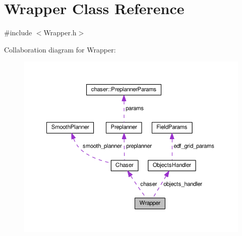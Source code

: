 \hypertarget{class_wrapper}{}\section{Wrapper Class Reference}
\label{class_wrapper}


{\ttfamily \#include $<$Wrapper.\+h$>$}



Collaboration diagram for Wrapper\+:\nopagebreak
\begin{figure}[H]
\begin{center}
\leavevmode
\includegraphics[width=350pt]{class_wrapper__coll__graph}
\end{center}
\end{figure}
